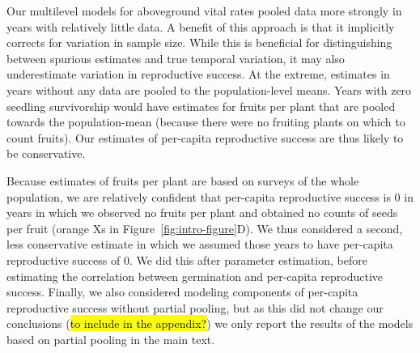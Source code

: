 \documentclass[12pt, oneside, titlepage]{article}   	%
\begin{document}
{Our multilevel models for aboveground vital rates pooled data more strongly in years with relatively little data. A benefit of this approach is that it implicitly corrects for variation in sample size. While this is beneficial for distinguishing between spurious estimates and true temporal variation, it may also underestimate variation in reproductive success. At the extreme, estimates in years without any data are pooled to the population-level means. Years with zero seedling survivorship would have estimates for fruits per plant that are pooled towards the population-mean (because there were no fruiting plants on which to count fruits). Our estimates of per-capita reproductive success are thus likely to be conservative. 

Because estimates of fruits per plant are based on surveys of the whole population, we are relatively confident that per-capita reproductive success is 0 in years in which we observed no fruits per plant and obtained no counts of seeds per fruit (orange Xs in Figure~\ref{fig:intro-figure}D). We thus considered a second, less conservative estimate in which we assumed those years to have per-capita reproductive success of 0. We did this after parameter estimation, before estimating the correlation between germination and per-capita reproductive success. Finally, we also considered modeling components of per-capita reproductive success without partial pooling, but as this did not change our conclusions (\hl{to include in the appendix?}) we only report the results of the models based on partial pooling in the main text.  



}
\end{document}
